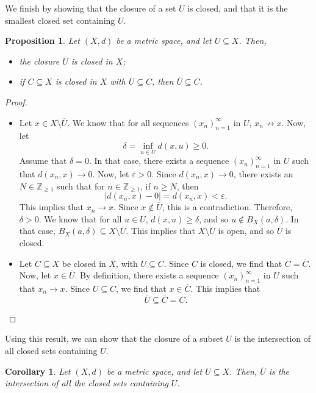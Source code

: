 \documentclass[a4paper, openany]{memoir}
\theoremstyle{definition}
\theoremstyle{plain}
\newtheorem{proposition}[definition]{Proposition}
\newtheorem{corollary}[definition]{Corollary}
\begin{document}
We finish by showing that the closure of a set $U$ is closed, and that it is the smallest closed set containing $U$.
\begin{proposition}
Let $(X, d)$ be a metric space, and let $U \subseteq X$. Then, 
\begin{itemize}
    \item the closure $\overline{U}$ is closed in $X$;
    \item if $C \subseteq X$ is closed in $X$ with $U \subseteq C$, then $\overline{U} \subseteq C$.
\end{itemize}
\end{proposition}
\begin{proof}
\hspace*{0pt}
\begin{itemize}
    \item Let $x \in X \setminus \overline{U}$. We know that for all sequences $(x_n)_{n=1}^{\infty}$ in $U$, $x_n \not\to x$. Now, let
    \[\delta = \inf_{u \in U} d(x, u) \geqslant 0.\]
    Assume that $\delta = 0$. In that case, there exists a sequence $(x_n)_{n=1}^{\infty}$ in $U$ such that $d(x_n, x) \to 0$. Now, let $\varepsilon > 0$. Since $d(x_n, x) \to 0$, there exists an $N \in \mathbb{Z}_{\geqslant 1}$ such that for $n \in \mathbb{Z}_{\geqslant 1}$, if $n \geqslant N$, then 
    \[|d(x_n, x) - 0| = d(x_n, x) < \varepsilon.\]
    This implies that $x_n \to x$. Since $x \not\in \overline{U}$, this is a contradiction. Therefore, $\delta > 0$. We know that for all $u \in U$, $d(x, u) \geqslant \delta$, and so $u \not\in B_X(a, \delta)$. In that case, $B_X(a, \delta) \subseteq X \setminus \overline{U}$. This implies that $X \setminus \overline{U}$ is open, and so $\overline{U}$ is closed.
    
    \item Let $C \subseteq X$ be closed in $X$, with $U \subseteq C$. Since $C$ is closed, we find that $C = \overline{C}$. Now, let $x \in \overline{U}$. By definition, there exists a sequence $(x_n)_{n=1}^{\infty}$ in $U$ such that $x_n \to x$. Since $U \subseteq C$, we find that $x \in \overline{C}$. This implies that
    \[\overline{U} \subseteq \overline{C} = C.\]
\end{itemize}
\end{proof}
\noindent Using this result, we can show that the closure of a subset $U$ is the intersection of all closed sets containing $U$.
\begin{corollary}
Let $(X, d)$ be a metric space, and let $U \subseteq X$. Then, $\overline{U}$ is the intersection of all the closed sets containing $U$.
\end{corollary}
\end{document}
